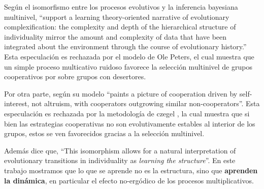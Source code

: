\documentclass[a4paper,10pt]{article}
\begin{document}
Según \cite{czegel2019-bayesianEvolution} el isomorfismo entre los procesos evolutivos y la inferencia bayesiana multinivel,  ``support a learning theory-oriented narrative of evolutionary complexification: the complexity and depth of the hierarchical structure of individuality mirror the amount and complexity of data that have been integrated about the environment through the course of evolutionary history.''
Esta especulación es rechazada por el modelo de Ole Peters, el cual muestra que un simple proceso multicativo ruidoso favorece la selección multinivel de grupos cooperativos por sobre grupos con desertores.

Por otra parte, según \cite{peters} su modelo ``paints a picture of cooperation driven by self-interest, not altruism, with cooperators outgrowing similar non-cooperators''.
Esta especulación es rechazada por la metodología de czegel \cite{czegel2019-bayesianEvolution}, la cual muestra que si bien las estrategias cooperativas no son evolutivamente estables al interior de los grupos, estos se ven favorecidos gracias a la selección multinivel.

Además \cite{czegel2019-bayesianEvolution} dice que, ``This isomorphism allows for a natural interpretation of evolutionary transitions in individuality as \emph{learning the structure}''.
En este trabajo mostramos que lo que se aprende no es la estructura, sino que \textbf{aprenden la dinámica}, en particular el efecto no-ergódico de los procesos multiplicativos.



% 
{\footnotesize


}
\end{document}
